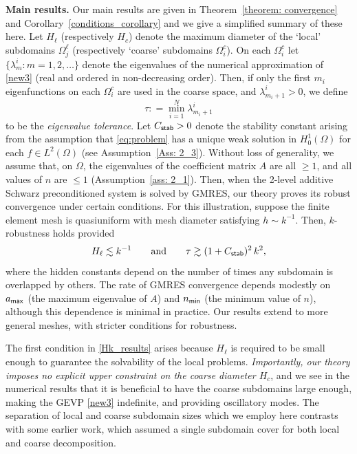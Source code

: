 \documentclass[numbers,webpdf,imaiai]{ima-authoring-template}%
\theoremstyle{thmstyletwo}%
\numberwithin{equation}{section}
\newcommand{\assign}{\mathrel{\mathop:}=}
\numberwithin{equation}{section}
\newcommand{\Cstab}{C_{\textup{\textsf{stab}}}}
\newcommand{\amax}{a_{\textup{\textsf{max}}}}
\newcommand{\nmin}{n_{\textup{\textsf{min}}}}
\begin{document}
{\vspace{0.1cm}
\noindent
\textbf{Main results.}
Our main results are  given in Theorem~\ref{theorem: convergence} and Corollary~\ref{conditions_corollary} 
and we give a simplified summary of these here.  
Let $H_\ell$ (respectively $H_c$) denote the maximum diameter of the `local' subdomains $\Omega_j^\ell$ 
(respectively `coarse' subdomains $\Omega_i^c$).  
On each $\Omega_i^c$ let $\{\lambda_m^i: m = 1,2,\ldots\}$ denote the eigenvalues of the numerical approximation of
\eqref{new3} (real and ordered in non-decreasing order). 
Then, if only the first $m_i$ eigenfunctions on each $\Omega_i^c$ are used in the coarse space, and $\lambda_{m_i +1 }^i > 0$, 
we define   
\begin{equation}
	\tau \assign \min_{i=1}^N \lambda^i_{m_i+1}
	\label{def:tau}
\end{equation}
to be the \textit{eigenvalue tolerance}.
Let $\Cstab > 0$ denote the stability constant arising from the assumption that \eqref{eq:problem} has a unique weak solution 
in $H^1_0(\Omega)$ for each $f \in L^2(\Omega)$  (see  Assumption~\ref{Ass: 2_3}).   
Without loss of generality, we assume that, on $\Omega$, the eigenvalues of the coefficient matrix $A$ are all $\ge 1$, 
and all values of $n$ are $\leq 1$ (Assumption~\ref{ass: 2_1}). 
Then, when the 2-level additive Schwarz preconditioned system is solved by GMRES, our theory proves 
its robust convergence under certain conditions. 
For this illustration, suppose the finite element mesh is quasiuniform with mesh diameter satisfying $h \sim k^{-1}$. 
Then, $k$-robustness holds provided
\begin{equation}
\label{Hk_results}
    H_\ell \lesssim k^{-1} \qquad \text{and} \qquad  \tau \gtrsim  (1+\Cstab)^{2}\, k^{2} ,
\end{equation}
where the hidden constants depend on the number of times any subdomain is overlapped by others. 
The rate of GMRES convergence depends modestly on $\amax$ (the maximum eigenvalue of $A$) and $\nmin$ (the minimum value of $n$), 
although this dependence is minimal in practice. Our results extend to more general meshes, with stricter conditions for robustness.


The first condition in \eqref{Hk_results} arises because $H_\ell$ is required to be small enough to guarantee the solvability of the local problems.  
\textit{Importantly, our theory imposes no explicit upper constraint on the coarse diameter $H_c$}, 
and we see in the numerical results that it is beneficial to have the coarse subdomains large enough, 
making the GEVP \eqref{new3} indefinite, and providing oscillatory modes.  
The separation of local and coarse subdomain sizes which we employ here contrasts with some earlier work, 
which assumed a single subdomain cover for both local and coarse decomposition. 

}
\end{document}
